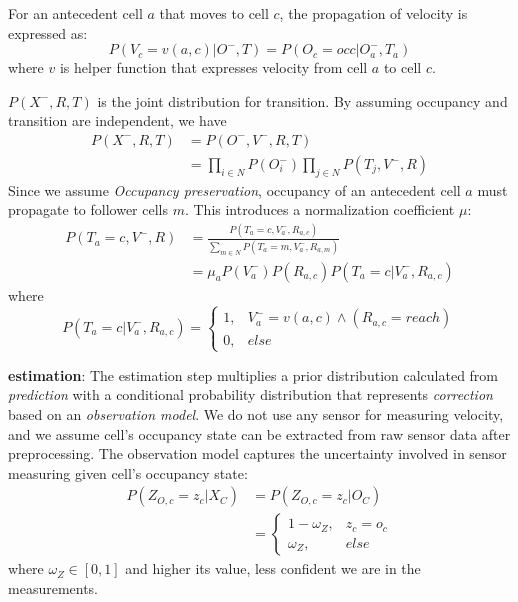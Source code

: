 \begin{my_enumerate}
For an antecedent cell $a$ that moves to cell $c$, the propagation of velocity is expressed as:
\begin{equation}
P(V_c=v(a, c)| O^-, T) = P(O_c=occ|O^-_a, T_a) \label{eq:6}
\end{equation}
where $v$ is helper function that expresses velocity from cell $a$ to cell $c$.

$P(X^-, R, T)$ is the joint distribution for transition. By assuming occupancy and transition are independent, we have
\begin{align}
P(X^-, R, T) &= P(O^-, V^-, R, T) \\
             &= \prod_{i \in N} P(O_i^-) \prod_{j \in N} P(T_j, V^-, R)
\end{align}
Since we assume \textit{Occupancy preservation}, occupancy of an antecedent cell $a$ must propagate to follower cells $m$. This introduces a normalization coefficient $\mu$:
\begin{align}
P(T_a=c, V^-, R) &= \frac{P(T_a=c, V^-_a, R_{a,c})}{\sum_{m \in N}P(T_a=m, V^-_a, R_{a,m})} \\
                 &= \mu_a P(V_a^-) P(R_{a,c})P(T_a=c|V_a^-, R_{a, c}) \label{eq:t}
\end{align}
where 
\begin{equation}
P(T_a=c|V^-_a, R_{a,c}) =
  \begin{cases}
  1, & V_a^- = v(a, c) \wedge (R_{a,c} = reach) \\
  0, & else
  \end{cases} 
  \label{eq:t1}
\end{equation}

\item \textbf{estimation}: The estimation step multiplies a prior distribution calculated from \textit{prediction} with a conditional probability distribution that represents \textit{correction} based on an \textit{observation model}. We do not use any sensor for measuring velocity, and we assume cell's occupancy state can be extracted from raw sensor data after preprocessing. The observation model captures the uncertainty involved in sensor measuring given cell's occupancy state:
\begin{align}
P(Z_{O,c}=z_c|X_C) &= P(Z_{O,c}=z_c|O_C) \\
				   &=
				   \begin{cases}
				   1-\omega_Z, & z_c = o_c \\
				   \omega_Z,   & else
				   \end{cases}
\end{align}
where $\omega_Z \in [0,1]$ and higher its value, less confident we are in the measurements. 
\end{my_enumerate}

